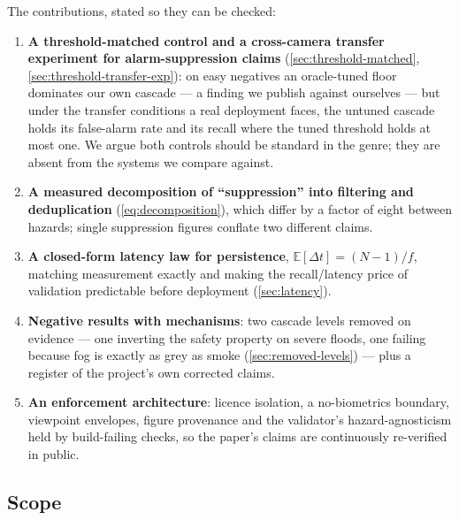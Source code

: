 The contributions, stated so they can be checked:

\begin{enumerate}
  \item \textbf{A threshold-matched control and a cross-camera transfer
        experiment for alarm-suppression claims}
        (\cref{sec:threshold-matched}, \cref{sec:threshold-transfer-exp}):
        on easy negatives an oracle-tuned floor dominates our own cascade — a
        finding we publish against ourselves — but under the transfer
        conditions a real deployment faces, the untuned cascade holds its
        false-alarm rate and its recall where the tuned threshold holds at
        most one. We argue both controls should be standard in the genre;
        they are absent from the systems we compare against.
  \item \textbf{A measured decomposition of ``suppression'' into filtering
        and deduplication} (\cref{eq:decomposition}), which differ by a
        factor of eight between hazards; single suppression figures conflate
        two different claims.
  \item \textbf{A closed-form latency law for persistence},
        $\mathbb{E}[\Delta t] = (N-1)/f$, matching measurement exactly and
        making the recall/latency price of validation predictable before
        deployment (\cref{sec:latency}).
  \item \textbf{Negative results with mechanisms}: two cascade levels
        removed on evidence — one inverting the safety property on severe
        floods, one failing because fog is exactly as grey as smoke
        (\cref{sec:removed-levels}) — plus a register of the project's own
        corrected claims.
  \item \textbf{An enforcement architecture}: licence isolation, a
        no-biometrics boundary, viewpoint envelopes, figure provenance and
        the validator's hazard-agnosticism held by build-failing checks, so
        the paper's claims are continuously re-verified in public.
\end{enumerate}

\subsection{Scope}

